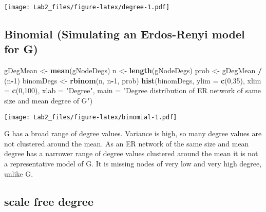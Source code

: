 \documentclass[]{article}
\newenvironment{Shaded}{\begin{snugshade}}{\end{snugshade}}
\newcommand{\KeywordTok}[1]{\textcolor[rgb]{0.13,0.29,0.53}{\textbf{#1}}}
\newcommand{\DataTypeTok}[1]{\textcolor[rgb]{0.13,0.29,0.53}{#1}}
\newcommand{\DecValTok}[1]{\textcolor[rgb]{0.00,0.00,0.81}{#1}}
\newcommand{\StringTok}[1]{\textcolor[rgb]{0.31,0.60,0.02}{#1}}
\newcommand{\OperatorTok}[1]{\textcolor[rgb]{0.81,0.36,0.00}{\textbf{#1}}}
\newcommand{\NormalTok}[1]{#1}
\begin{document}
\texttt{[image: Lab2\_files/figure-latex/degree-1.pdf]}

\subsection{Binomial (Simulating an Erdos-Renyi model for
G)}\label{binomial-simulating-an-erdos-renyi-model-for-g}

\begin{Shaded}
\begin{Highlighting}[]
\NormalTok{gDegMean <-}\StringTok{ }\KeywordTok{mean}\NormalTok{(gNodeDegs)}
\NormalTok{n <-}\StringTok{ }\KeywordTok{length}\NormalTok{(gNodeDegs)}
\NormalTok{prob <-}\StringTok{ }\NormalTok{gDegMean }\OperatorTok{/}\StringTok{ }\NormalTok{(n}\OperatorTok{-}\DecValTok{1}\NormalTok{)}
\NormalTok{binomDegs <-}\StringTok{ }\KeywordTok{rbinom}\NormalTok{(n, n}\OperatorTok{-}\DecValTok{1}\NormalTok{, prob)}
\KeywordTok{hist}\NormalTok{(binomDegs, }\DataTypeTok{ylim =} \KeywordTok{c}\NormalTok{(}\DecValTok{0}\NormalTok{,}\DecValTok{35}\NormalTok{), }\DataTypeTok{xlim =} \KeywordTok{c}\NormalTok{(}\DecValTok{0}\NormalTok{,}\DecValTok{100}\NormalTok{), }\DataTypeTok{xlab =} \StringTok{"Degree"}\NormalTok{, }
     \DataTypeTok{main =} \StringTok{"Degree distribution of ER network of same size and mean degree of G"}\NormalTok{)}
\end{Highlighting}
\end{Shaded}

\texttt{[image: Lab2\_files/figure-latex/binomial-1.pdf]}

G has a broad range of degree values. Variance is high, so many degree
values are not clustered around the mean. As an ER network of the same
size and mean degree has a narrower range of degree values clustered
around the mean it is not a representative model of G. It is missing
nodes of very low and very high degree, unlike G.

\subsection{scale free degree}\label{scale-free-degree}
\end{document}
